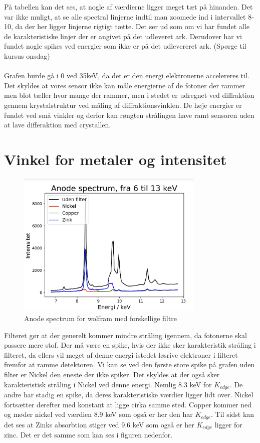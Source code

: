 \documentclass[a4paper,twoside]{article}
\begin{document}
På tabellen kan det ses, at nogle af værdierne ligger meget tæt på hinanden. Det var ikke muligt, at se alle spectral linjerne indtil man zoomede ind i intervallet 8-10, da der her ligger linjerne rigtigt tætte. Det ser ud som om vi har fundet alle de karakteristiske linjer der er angivet på det udleveret ark. Derudover har vi fundet nogle spikes ved energier som ikke er på det udlevereret ark. (Spørge til kursus onsdag)\\
\\Grafen burde gå i 0 ved 35keV, da det er den energi elektronerne accelereres til. Det skyldes at vores sensor ikke kan måle energierne af de fotoner der rammer men blot tæller hvor mange der rammer, men i stedet er udregnet ved diffraktion gennem krystalstruktur ved måling af diffraktionsvinklen. De høje energier er fundet ved små vinkler og derfor kan røngten strålingen have ramt sensoren uden at lave differaktion med crystallen.
\section{Vinkel for metaler og intensitet}
\begin{figure}[H]
\begin{centering}
\includegraphics[height=7cm]{Anode spectra.png}
\hspace{1cm}
\par\end{centering}
\caption{\label{cap:2ien} Anode spectrum for wolfram med forskellige filtre }
\end{figure}
Filteret gør at der generelt kommer mindre stråling igennem, da  fotonerne skal passere mere stof. Der må være en spike, hvis der ikke sker karakteristik stråling i filteret, da ellers vil meget af denne energi istedet løsrive elektroner i filteret fremfor at ramme detektoren. Vi kan se ved den første store spike på grafen uden filter er Nickel den eneste der ikke spiker. Det skyldes at der også sker karakteristisk stråling i Nickel ved denne energi. Nemlig 8.3 keV for $K_{edge}$. De andre har stadig en spike, da deres karakteristiske værdier ligger lidt over. Nickel fortsætter derefter med konstant at ligge cirka samme sted. Copper kommer ned og møder nickel ved værdien 8.9 keV som også er her den har $K_{edge}$. Til sidst kan det ses at Zinks absorbtion stiger ved 9.6 keV som også er her $K_{edge}$ ligger for zinc. Det er det samme som kan ses i figuren nedenfor. 
\end{document}
